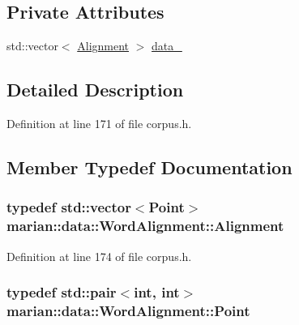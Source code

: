 \subsection*{Private Attributes}
\begin{DoxyCompactItemize}
\item 
std\+::vector$<$ \hyperlink{classmarian_1_1data_1_1WordAlignment_a30535cd052cdd3d686d53917d8be5259}{Alignment} $>$ \hyperlink{classmarian_1_1data_1_1WordAlignment_a03d54c486b6d888ad1d3605c6c402b2b}{data\+\_\+}
\end{DoxyCompactItemize}


\subsection{Detailed Description}


Definition at line 171 of file corpus.\+h.



\subsection{Member Typedef Documentation}
\subsubsection[{\texorpdfstring{Alignment}{Alignment}}]{\setlength{\rightskip}{0pt plus 5cm}typedef std\+::vector$<${\bf Point}$>$ {\bf marian\+::data\+::\+Word\+Alignment\+::\+Alignment}\hspace{0.3cm}{\ttfamily [private]}}\hypertarget{classmarian_1_1data_1_1WordAlignment_a30535cd052cdd3d686d53917d8be5259}{}\label{classmarian_1_1data_1_1WordAlignment_a30535cd052cdd3d686d53917d8be5259}


Definition at line 174 of file corpus.\+h.

\subsubsection[{\texorpdfstring{Point}{Point}}]{\setlength{\rightskip}{0pt plus 5cm}typedef std\+::pair$<$int, int$>$ {\bf marian\+::data\+::\+Word\+Alignment\+::\+Point}\hspace{0.3cm}{\ttfamily [private]}}\hypertarget{classmarian_1_1data_1_1WordAlignment_aeb672afb1cec0627e27447d9afb50357}{}\label{classmarian_1_1data_1_1WordAlignment_aeb672afb1cec0627e27447d9afb50357}


